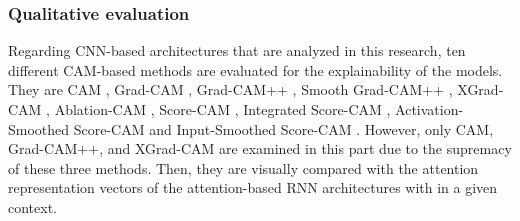 \documentclass{svproc}
\begin{document}
\subsubsection{Qualitative evaluation}
Regarding CNN-based architectures that are analyzed in this research, ten different CAM-based methods are evaluated for the explainability of the models. They are CAM \cite{zhou2016learning}, Grad-CAM \cite{selvaraju2017grad}, Grad-CAM++ \cite{chattopadhay2018grad}, Smooth Grad-CAM++ \cite{omeiza2019smooth}, XGrad-CAM \cite{fu2020axiom}, Ablation-CAM \cite{ramaswamy2020ablation}, Score-CAM \cite{wang2020score}, Integrated Score-CAM \cite{naidu2020cam}, Activation-Smoothed Score-CAM \cite{wang2020ss} and Input-Smoothed Score-CAM \cite{wang2020ss}. However, only CAM, Grad-CAM++, and XGrad-CAM are examined in this part due to the supremacy of these three methods. Then, they are visually compared with the attention representation vectors of the attention-based RNN architectures with in a given context. 
\end{document}
